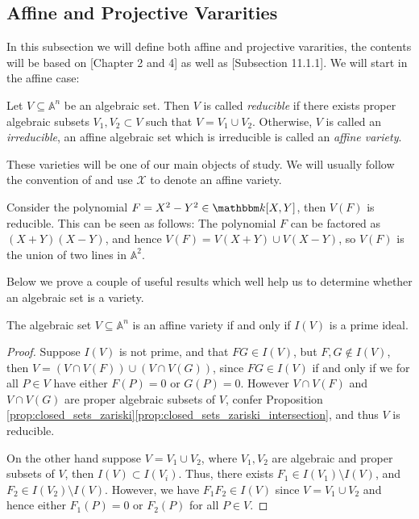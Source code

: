 \subsection{Affine and Projective Vararities}
In this subsection we will define both affine and projective vararities, the contents will be based on \cite{Fulton}[Chapter 2 and 4] as well as \cite{CCC_with_CA}[Subsection 11.1.1]. We will start in the affine case:

\begin{definition}\label{def:affine_variety}
Let $V \subseteq \mathbb{A}^{n}$ be an algebraic set. Then $V$ is called \textit{reducible} if there exists proper algebraic subsets $V_1, V_2 \subset V$ such that $V = V_1 \cup V_{2}$. Otherwise, $V$ is called an \textit{irreducible}, an affine algebraic set which is irreducible is called an \textit{affine variety}.
\end{definition}
These varieties will be one of our main objects of study. We will usually follow the convention of \cite{CCC_with_CA} and use $\mathcal{X}$ to denote an affine variety.
\begin{example}\label{exmp:reducible_set_in_plane}
  Consider the polynomial $F = X^{2} - Y^{2} \in \K[X, Y]$, then $V(F)$ is reducible. This can be seen as follows: The polynomial $F$ can be factored as $(X + Y)(X - Y)$, and hence $V(F) = V(X + Y) \cup V(X - Y)$, so $V(F)$ is the union of two lines in $\mathbb{A}^{2}$.
\end{example}
\newpage
Below we prove a couple of useful results which well help us to determine whether an algebraic set is a variety.
\begin{proposition}\label{prop:affine_sets_have_prime_ideals}
  The algebraic set $V \subseteq \mathbb{A}^{n}$ is an affine variety if and only if $I(V)$ is a prime ideal.
\end{proposition}
\begin{proof}
  Suppose $I(V)$ is not prime, and that $F G \in I(V)$, but $F, G \not\in I(V)$, then $V = (V \cap V(F)) \cup (V \cap V(G))$, since $F G \in I(V)$ if and only if we for all $P \in V$ have either $F(P) = 0$ or $G(P) = 0$. However $V \cap V(F)$ and $V \cap V(G)$ are proper algebraic subsets of $V$, confer Proposition \ref{prop:closed_sets_zariski}\ref{prop:closed_sets_zariski_intersection}, and thus $V$ is reducible.

  On the other hand suppose $V = V_{1} \cup V_{2}$, where $V_1, V_{2}$ are algebraic and proper subsets of $V$, then $I(V) \subset I(V_{i})$. Thus, there exists $F_{1} \in I(V_{1}) \setminus I(V)$, and $F_{2} \in I(V_{2}) \setminus I(V)$. However, we have $F_{1}F_{2} \in I(V)$ since $V = V_{1} \cup V_{2}$ and hence either $F_{1}(P) = 0$ or $F_{2}(P)$ for all $P \in V$.
\end{proof}

